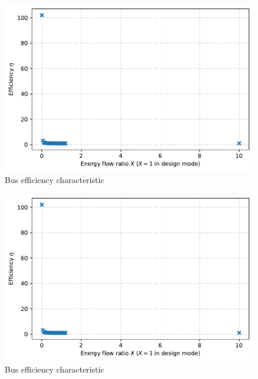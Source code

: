 \begin{minipage}{0.5\textwidth}
\begin{figure}[H]\begin{center}
\includegraphics[width=\textwidth]{figures/Bus_CharLine_district_heating_pumpdesign.pdf}
\caption{Bus efficiency characteristic}
\label{fig:Bus_CharLine_district heating pumpdesign}
\end{center}\end{figure}

\end{minipage}
\begin{minipage}{0.5\textwidth}
\begin{figure}[H]\begin{center}
\includegraphics[width=\textwidth]{figures/Bus_CharLine_evaporator_reciculation_pumpdesign.pdf}
\caption{Bus efficiency characteristic}
\label{fig:Bus_CharLine_evaporator reciculation pumpdesign}
\end{center}\end{figure}

\end{minipage}


